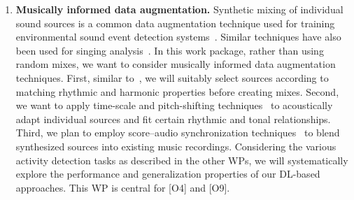 \documentclass[11pt,a4paper]{article}
\theoremstyle{plain} \newtheorem{define}{Definition}[section]
\begin{document}
{\begin{enumerate}[itemindent=0.5cm]
\item  \label{WE:aug}
\textbf{Musically informed data augmentation.} 
%
Synthetic mixing of individual sound sources is a common data augmentation technique used for training environmental sound event detection systems~\cite{Abesser20_AcousticSceneClassification_AppliedSciences,Zhang:2018:Mixup:ICLR}. Similar techniques have also been used for singing analysis~\cite{HsiehCFYY20_AddressingAccompanimentInSingerIdentification_ICASSP,LeeN19_EmbeddingSingingVoice_ISMIR}. In this work package, rather than using random mixes, we want to consider musically informed data augmentation techniques. First, similar to~\cite{DaviesHYG14_MusicMashups_TASLP,LeeN19_EmbeddingSingingVoice_ISMIR}, we will suitably select sources according to matching rhythmic and harmonic properties before creating mixes. Second, we want to apply time-scale and pitch-shifting techniques~\cite{DriedgerM14_TSM_DAFx} to acoustically adapt individual sources and fit certain rhythmic and tonal relationships. Third, we plan to employ score--audio synchronization techniques~\cite{EwertMG09_HighResAudioSync_ICASSP} to blend synthesized sources into existing music recordings. 
%
Considering the various activity detection tasks as described in the other WPs, we will systematically explore the performance and generalization properties of our DL-based approaches. This WP is central for [O4] and [O9].
%
%


\end{enumerate}}
\end{document}

